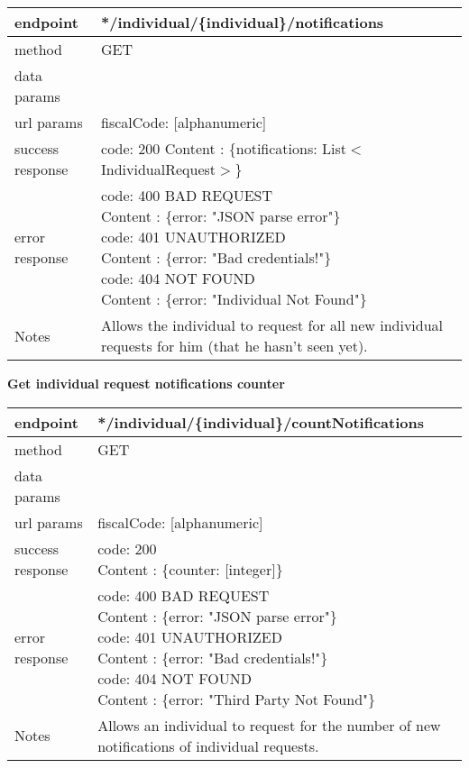 	\begin{tabularx}{\linewidth}{| l| l }
		\hline
		endpoint & */individual/\{individual\}/notifications \\
		\hline
		method & GET \\
		\hline
		data params & \\
		\hline
		url params &
		\parbox{0.7\textwidth}{
			\bigskip
			fiscalCode: [alphanumeric]
			\bigskip
		} \\
		\hline
		success response &
		\parbox{0.7\textwidth}{
			\bigskip
			code: 200\\
			Content : \{notifications: List$<$IndividualRequest$>$\}
			\bigskip
		} \\
		\hline
		error response &
		\parbox{0.7\textwidth}{
			\bigskip
			code: 400 BAD REQUEST \\
			Content : \{error: "JSON parse error"\}\\
			code: 401 UNAUTHORIZED \\
			Content : \{error: "Bad credentials!"\}\\
			code: 404 NOT FOUND \\
			Content : \{error: "Individual Not Found"\}
			\bigskip
		} \\
		\hline
		Notes & 
		\parbox{0.7\textwidth}{
			\bigskip Allows the individual to request for all new individual requests for him (that he hasn't seen yet).
		\bigskip}  \\
		\hline
	\end{tabularx}
	
	\textbf{Get individual request notifications counter} \\

	\begin{tabularx}{\linewidth}{| l| l }
		\hline
		endpoint & */individual/\{individual\}/countNotifications \\
		\hline
		method & GET \\
		\hline
		data params & \\
		\hline
		url params &
		\parbox{0.7\textwidth}{
			\bigskip
			fiscalCode: [alphanumeric]
			\bigskip
		} \\
		\hline
		success response &
		\parbox{0.7\textwidth}{
			\bigskip
			code: 200\\
			Content : \{counter: [integer]\}
			\bigskip
		} \\
		\hline
		error response &
		\parbox{0.7\textwidth}{
			\bigskip
			code: 400 BAD REQUEST \\
			Content : \{error: "JSON parse error"\}\\
			code: 401 UNAUTHORIZED \\
			Content : \{error: "Bad credentials!"\}\\
			code: 404 NOT FOUND \\
			Content : \{error: "Third Party Not Found"\}
			\bigskip
		} \\
		\hline
		Notes & 
		\parbox{0.7\textwidth}{
			\bigskip Allows an individual to request for the number of new notifications of individual requests.
		\bigskip}  \\
		\hline
	\end{tabularx}
	
